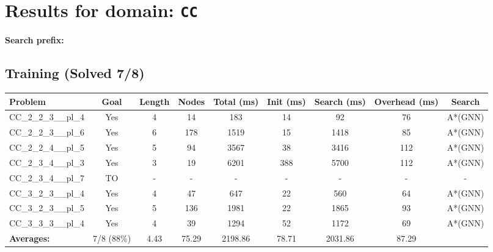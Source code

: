 \documentclass{article}
\begin{document}
\section*{Results for domain: \texttt{CC}}
\textbf{Search prefix:} 
\\[0.5cm]
\subsection*{Training (Solved 7/8)}
\begin{tabular}{lcccccccc}
\toprule
Problem & Goal & Length & Nodes & Total (ms) & Init (ms) & Search (ms) & Overhead (ms) & Search \\
\midrule
CC\_2\_2\_3\_\_pl\_4 & Yes & 4 & 14 & 183 & 14 & 92 & 76 & A*(GNN) \\
CC\_2\_2\_3\_\_pl\_6 & Yes & 6 & 178 & 1519 & 15 & 1418 & 85 & A*(GNN) \\
CC\_2\_2\_4\_\_pl\_5 & Yes & 5 & 94 & 3567 & 38 & 3416 & 112 & A*(GNN) \\
CC\_2\_3\_4\_\_pl\_3 & Yes & 3 & 19 & 6201 & 388 & 5700 & 112 & A*(GNN) \\
CC\_2\_3\_4\_\_pl\_7 & TO & - & - & - & - & - & - & - \\
CC\_3\_2\_3\_\_pl\_4 & Yes & 4 & 47 & 647 & 22 & 560 & 64 & A*(GNN) \\
CC\_3\_2\_3\_\_pl\_5 & Yes & 5 & 136 & 1981 & 22 & 1865 & 93 & A*(GNN) \\
CC\_3\_3\_3\_\_pl\_4 & Yes & 4 & 39 & 1294 & 52 & 1172 & 69 & A*(GNN) \\
\textbf{Averages:} & 7/8 (88\%) & 4.43 & 75.29 & 2198.86 & 78.71 & 2031.86 & 87.29 & \\
\bottomrule
\end{tabular}
\\[0.7cm]
\end{document}
